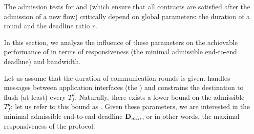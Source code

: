 The admission tests for \ap and \cp (which ensure that all contracts are satisfied after the admission of a new flow) critically depend on global parameters: the duration of a round \rlength and the deadline ratio $r$.

In this section, we analyze the influence of these parameters on the achievable performance of \DRP in terms of responsiveness (\ie the minimal admissible end-to-end deadline) and bandwidth.


Let us assume that the duration of communication rounds \rlength is given.
\DRP handles messages between application interfaces (\ie the \APs) and constrains the destination \apdst to flush \bolt (at least) every $T_f^d$. Naturally, there exists a lower bound on the admissible $T_f^d$; let us refer to this bound as \tfdmin.
Given these parameters, we are interested in the minimal admissible end-to-end deadline $\mathbf{D}_{min}$, or in other words, the maximal responsiveness of the protocol.

